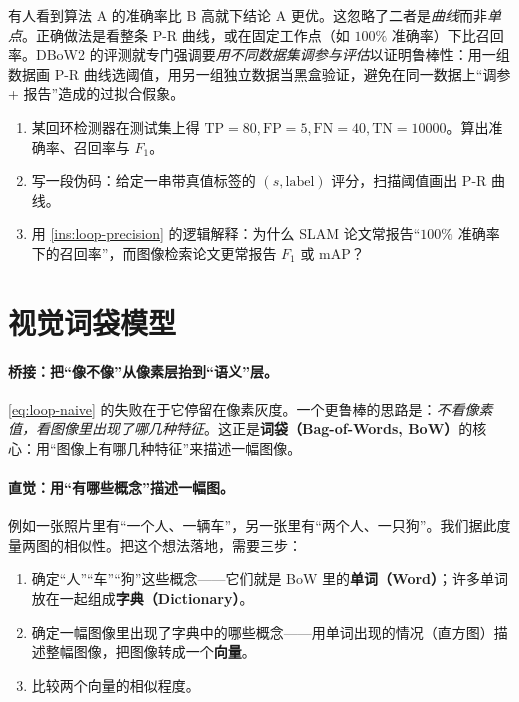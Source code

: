 \begin{pitfall}
有人看到算法 A 的准确率比 B 高就下结论 A 更优。这忽略了二者是\emph{曲线}而非\emph{单点}。正确做法是看整条 P-R 曲线，或在固定工作点（如 $100\%$ 准确率）下比召回率。DBoW2 的评测就专门强调要\emph{用不同数据集调参与评估}以证明鲁棒性\cite{galvez2012bags}：用一组数据画 P-R 曲线选阈值，用另一组独立数据当黑盒验证，避免在同一数据上“调参 + 报告”造成的过拟合假象。
\end{pitfall}

\begin{practice}
\begin{enumerate}
  \item 某回环检测器在测试集上得 $\mathrm{TP}=80,\mathrm{FP}=5,\mathrm{FN}=40,\mathrm{TN}=10000$。算出准确率、召回率与 $F_1$。
  \item 写一段伪码：给定一串带真值标签的 $(s,\text{label})$ 评分，扫描阈值画出 P-R 曲线。
  \item 用 \cref{ins:loop-precision} 的逻辑解释：为什么 SLAM 论文常报告“$100\%$ 准确率下的召回率”，而图像检索论文更常报告 $F_1$ 或 mAP？
\end{enumerate}
\end{practice}

\section{视觉词袋模型}
\label{sec:loop-bow}

\paragraph{桥接：把“像不像”从像素层抬到“语义”层。}
\cref{eq:loop-naive} 的失败在于它停留在像素灰度。一个更鲁棒的思路是：\emph{不看像素值，看图像里出现了哪几种特征}。这正是\textbf{词袋（Bag-of-Words, BoW）}的核心\cite{gaoxiang2019slam14}：用“图像上有哪几种特征”来描述一幅图像。

\paragraph{直觉：用“有哪些概念”描述一幅图。}
例如一张照片里有“一个人、一辆车”，另一张里有“两个人、一只狗”。我们据此度量两图的相似性。把这个想法落地，需要三步\cite{gaoxiang2019slam14}：
\begin{enumerate}
  \item 确定“人”“车”“狗”这些概念——它们就是 BoW 里的\textbf{单词（Word）}；许多单词放在一起组成\textbf{字典（Dictionary）}。
  \item 确定一幅图像里出现了字典中的哪些概念——用单词出现的情况（直方图）描述整幅图像，把图像转成一个\textbf{向量}。
  \item 比较两个向量的相似程度。
\end{enumerate}

